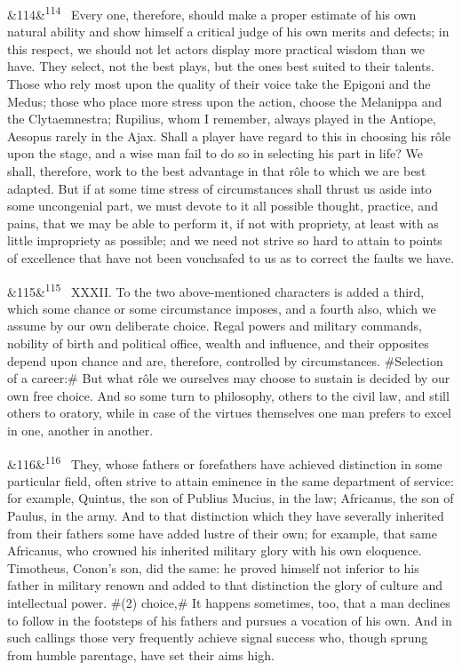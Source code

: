 \documentclass[12pt]{article}
\newcommand{\para}[1][]{\par\noindent\ifx&#1&\else\textsuperscript{\footnotesize #1}~\fi}
\begin{document}
\para[114] Every one, therefore, should make a proper estimate of his own natural ability and show himself a critical judge of his own merits and defects; in this respect, we should not let actors display more practical wisdom than we have. They select, not the best plays, but the ones best suited to their talents. Those who rely most upon the quality of their voice take the Epigoni and the Medus; those who place more stress upon the action, choose the Melanippa and the Clytaemnestra; Rupilius, whom I remember, always played in the Antiope, Aesopus rarely in the Ajax. Shall a player have regard to this in choosing his rôle upon the stage, and a wise man fail to do so in selecting his part in life? We shall, therefore, work to the best advantage in that rôle to which we are best adapted. But if at some time stress of circumstances shall thrust us aside into some uncongenial part, we must devote to it all possible thought, practice, and pains, that we may be able to perform it, if not with propriety, at least with as little impropriety as possible; and we need not strive so hard to attain to points of excellence that have not been vouchsafed to us as to correct the faults we have.

\para[115] XXXII. To the two above-mentioned characters is added a third, which some chance or some circumstance imposes, and a fourth also, which we assume by our own deliberate choice. Regal powers and military commands, nobility of birth and political office, wealth and influence, and their opposites depend upon chance and are, therefore, controlled by circumstances. \#Selection of a career:\# But what rôle we ourselves may choose to sustain is decided by our own free choice. And so some turn to philosophy, others to the civil law, and still others to oratory, while in case of the virtues themselves one man prefers to excel in one, another in another.

\para[116] They, whose fathers or forefathers have achieved distinction in some particular field, often strive to attain eminence in the same department of service: for example, Quintus, the son of Publius Mucius, in the law; Africanus, the son of Paulus, in the army. And to that distinction which they have severally inherited from their fathers some have added lustre of their own; for example, that same Africanus, who crowned his inherited military glory with his own eloquence. Timotheus, Conon's son, did the same: he proved himself not inferior to his father in military renown and added to that distinction the glory of culture and intellectual power. \#(2) choice,\# It happens sometimes, too, that a man declines to follow in the footsteps of his fathers and pursues a vocation of his own. And in such callings those very frequently achieve signal success who, though sprung from humble parentage, have set their aims high.
\end{document}

